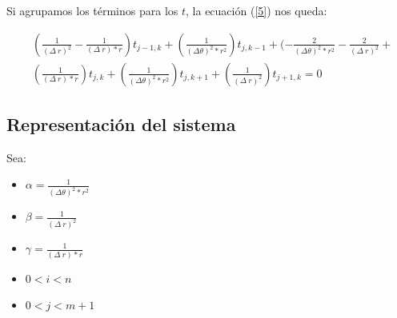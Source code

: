 Si agrupamos los términos para los $t$, la ecuación (\ref{5}) nos queda:

\begin{equation}
   \begin{aligned}
    &(\frac{1}{(\Delta\ r)^2} - \frac{1}{(\Delta\ r) * r})t_{j-1,k} + (\frac{1}{(\Delta\theta)^2 * r^2})t_{j,k-1} +  (-\frac{2}{(\Delta\theta)^2 * r^2}-\frac{2}{(\Delta\ r)^2} +\\
    &(\frac{1} {(\Delta\ r) * r})t_{j,k} + (\frac{1}{(\Delta\theta)^2 * r^2})t_{j,k+1} + (\frac{1}{(\Delta\ r)^2})t_{j+1,k} = 0
    \end{aligned}
\end{equation}

\subsection{Representación del sistema}
Sea:

\begin{itemize}
    \item $\alpha = \frac{1}{(\Delta\theta)^2 * r^2}$
    \item $\beta = \frac{1}{(\Delta\ r)^2}$
    \item $\gamma = \frac{1}{(\Delta\ r) * r}$
    \item $0 < i < n$
    \item $0 < j < m+1$
\end{itemize}

